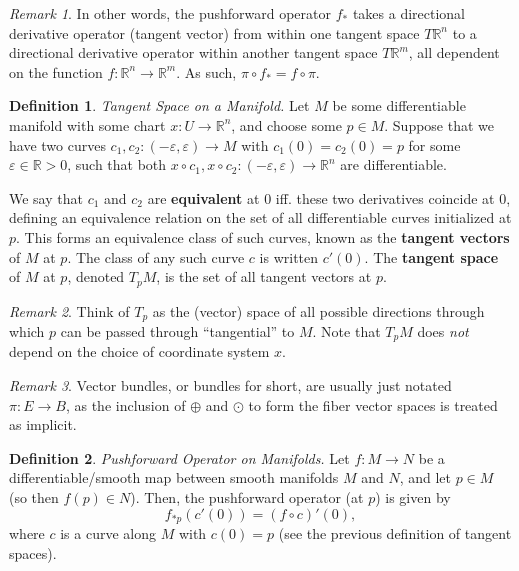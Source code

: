 \documentclass[10pt,landscape]{article}
\theoremstyle{definition}
\newtheorem{definition}{Definition}[section]
\theoremstyle{theorem}
\theoremstyle{summary}
\theoremstyle{remark}
\newtheorem*{remark}{Remark}
\newcommand{\R}{\mathbb{R}}
\newcommand{\Rn}{\mathbb{R}^n}
\begin{document}
\begin{multicols*}{3}
\begin{remark}
In other words, the pushforward operator $f_*$ takes a directional derivative operator (tangent vector) from within one tangent space $T\Rn$ to a directional derivative operator within another tangent space $T\R^m$, all dependent on the function $f:\Rn\rightarrow\R^m$. As such, $\pi\circ f_* = f \circ \pi$.
\end{remark}

\theoremstyle{definition}
\begin{definition}{\textit{Tangent Space on a Manifold.}}
    Let $M$ be some differentiable manifold with some chart $x:U\rightarrow\Rn$, and choose some $p\in M$. Suppose that we have two curves $c_1,c_2:(-\varepsilon,\varepsilon)\rightarrow M$ with $c_1(0)=c_2(0) = p$ for some $\varepsilon\in\R>0$, such that both $x\circ c_1, x\circ c_2:(-\varepsilon,\varepsilon)\rightarrow \Rn$ are differentiable.

    We say that $c_1$ and $c_2$ are \textbf{equivalent} at $0$ iff. these two derivatives coincide at $0$, defining an equivalence relation on the set of all differentiable curves initialized at $p$. This forms an equivalence class of such curves, known as the \textbf{tangent vectors} of $M$ at $p$. The class of any such curve $c$ is written $c'(0)$. The \textbf{tangent space} of $M$ at $p$, denoted $T_pM$, is the set of all tangent vectors at $p$.
\end{definition}

\begin{remark}
    Think of $T_p$ as the (vector) space of all possible directions through which $p$ can be passed through ``tangential'' to $M$. Note that $T_pM$ does \textit{not} depend on the choice of coordinate system $x$. 
\end{remark}

\begin{remark}
Vector bundles, or bundles for short, are usually just notated $\pi: E\rightarrow B$, as the inclusion of $\oplus$ and $\odot$ to form the fiber vector spaces is treated as implicit.
\end{remark}

\theoremstyle{definition}
\begin{definition}{\textit{Pushforward Operator on Manifolds.}}
    \label{def_pushforward}
    Let $f:M\rightarrow N$ be a differentiable/smooth map between smooth manifolds $M$ and $N$, and let $p\in M$ (so then $f(p)\in N$). Then, the pushforward operator (at $p$) is given by
    \begin{equation}
        f_{*p}(c'(0)) = (f\circ c)'(0),
    \end{equation}
    where $c$ is a curve along $M$ with $c(0) = p$ (see the previous definition of tangent spaces).
\end{definition}


\end{multicols*}
\end{document}
